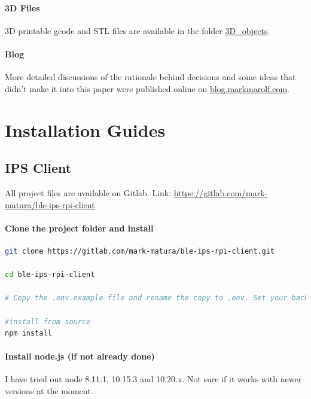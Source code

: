 \documentclass[a4paper, oneside]{ipsreport}
\begin{document}
\subsubsection{3D Files}
\label{appendix:3dfiles}
3D printable gcode and STL files are available in the folder \href{https://gitlab.com/mark-matura/ble-ips-files/-/tree/master/3D_objects}{3D\_objects}.

\subsubsection{Blog}
More detailed discussions of the rationale behind decisions and some ideas that didn't make it into this paper were published online on \href{https://blog.markmarolf.com}{blog.markmarolf.com}.

\chapter{Installation Guides}
\label{installationguide}
\section{IPS Client}
\label{installationguide:ipsclient}
All project files are available on Gitlab. Link: \href{https://gitlab.com/mark-matura/ble-ips-rpi-client}{https://gitlab.com/mark-matura/ble-ips-rpi-client}
\subsubsection*{Clone the project folder and install}

\begin{lstlisting}[language=bash]
git clone https://gitlab.com/mark-matura/ble-ips-rpi-client.git

cd ble-ips-rpi-client

# Copy the .env.example file and rename the copy to .env. Set your backend base url where you have the ble-ips-api set up by entering it in the .env file.

#install from source
npm install
\end{lstlisting}

\subsubsection*{Install node.js (if not already done)}

I have tried out node 8.11.1, 10.15.3 and 10.20.x. Not sure if it works with newer versions at the moment.
\end{document}
